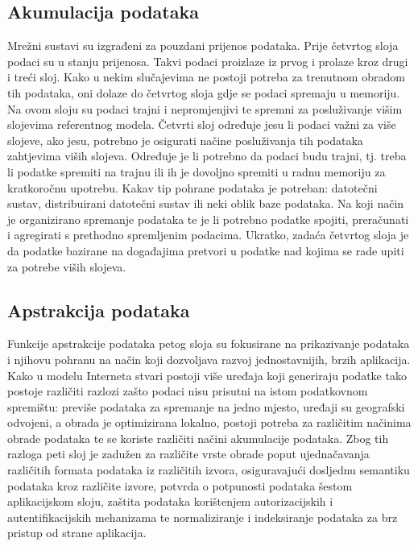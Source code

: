 \documentclass[times, utf8, diplomski]{fer}
\begin{document}
\subsection{Akumulacija podataka}
Mrežni sustavi su izgrađeni za pouzdani prijenos podataka. Prije četvrtog sloja podaci su u stanju prijenosa. Takvi podaci proizlaze iz prvog i prolaze kroz drugi i treći sloj. Kako u nekim slučajevima ne postoji potreba za trenutnom obradom tih podataka, oni dolaze do četvrtog sloja gdje se podaci spremaju u memoriju. Na ovom sloju su podaci trajni i nepromjenjivi te spremni za posluživanje višim slojevima referentnog modela. Četvrti sloj određuje jesu li podaci važni za više slojeve, ako jesu, potrebno je osigurati načine posluživanja tih podataka zahtjevima viših slojeva. Određuje je li potrebno da podaci budu trajni, tj. treba li podatke spremiti na trajnu ili ih je dovoljno spremiti u radnu memoriju za kratkoročnu upotrebu. Kakav tip pohrane podataka je potreban: datotečni sustav, distribuirani datotečni sustav ili neki oblik baze podataka. Na koji način je organizirano spremanje podataka te je li potrebno podatke spojiti, preračunati i agregirati s prethodno spremljenim podacima. Ukratko, zadaća četvrtog sloja je da podatke bazirane na događajima pretvori u podatke nad kojima se rade upiti za potrebe viših slojeva.

\subsection{Apstrakcija podataka}
Funkcije apstrakcije podataka petog sloja su fokusirane na prikazivanje podataka i njihovu pohranu na način koji dozvoljava razvoj jednostavnijih, brzih aplikacija. Kako u modelu Interneta stvari postoji više uređaja koji generiraju podatke tako postoje različiti razlozi zašto podaci nisu prisutni na istom podatkovnom spremištu: previše podataka za spremanje na jedno mjesto, uređaji su geografski odvojeni, a obrada je optimizirana lokalno, postoji potreba za različitim načinima obrade podataka te se koriste različiti načini akumulacije podataka. Zbog tih razloga peti sloj je zadužen za različite vrste obrade poput ujednačavanja različitih formata podataka iz različitih izvora, osiguravajući dosljednu semantiku podataka kroz različite izvore, potvrda o potpunosti podataka šestom aplikacijskom sloju, zaštita podataka korištenjem autorizacijskih i autentifikacijskih mehanizama te normaliziranje i indeksiranje podataka za brz pristup od strane aplikacija.
\end{document}
